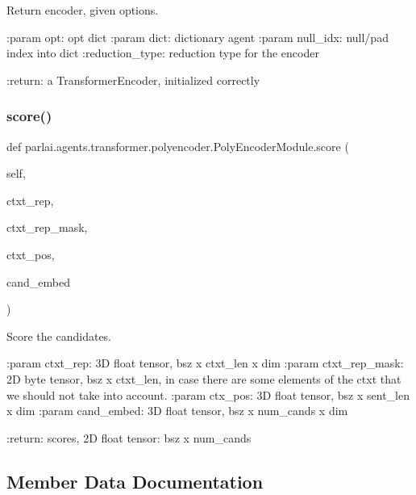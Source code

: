 \begin{DoxyVerb}Return encoder, given options.

:param opt:
    opt dict
:param dict:
    dictionary agent
:param null_idx:
    null/pad index into dict
:reduction_type:
    reduction type for the encoder

:return:
    a TransformerEncoder, initialized correctly
\end{DoxyVerb}
 \mbox{\label{classparlai_1_1agents_1_1transformer_1_1polyencoder_1_1PolyEncoderModule_a52218a8c0594ff4d5bf8e666dc38f508}} 
\subsubsection{\texorpdfstring{score()}{score()}}
{\footnotesize\ttfamily def parlai.\+agents.\+transformer.\+polyencoder.\+Poly\+Encoder\+Module.\+score (\begin{DoxyParamCaption}\item[{}]{self,  }\item[{}]{ctxt\+\_\+rep,  }\item[{}]{ctxt\+\_\+rep\+\_\+mask,  }\item[{}]{ctxt\+\_\+pos,  }\item[{}]{cand\+\_\+embed }\end{DoxyParamCaption})}

\begin{DoxyVerb}Score the candidates.

:param ctxt_rep:
    3D float tensor, bsz x ctxt_len x dim
:param ctxt_rep_mask:
    2D byte tensor, bsz x ctxt_len, in case there are some elements
    of the ctxt that we should not take into account.
:param ctx_pos: 3D float tensor, bsz x sent_len x dim
:param cand_embed: 3D float tensor, bsz x num_cands x dim

:return: scores, 2D float tensor: bsz x num_cands
\end{DoxyVerb}
 

\subsection{Member Data Documentation}
\mbox{\label{classparlai_1_1agents_1_1transformer_1_1polyencoder_1_1PolyEncoderModule_a8fab02ef33d1e1ee413e4bcbe25aa03b}} 
